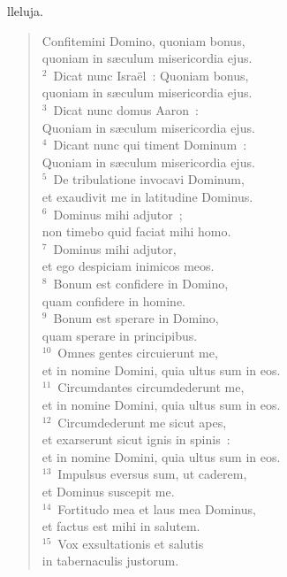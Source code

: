 \bchapter
{}lleluja. \begin{flushleft}\begin{verse}\vspace{6pt}Confitemini Domino, quoniam bonus,\\ quoniam in s\ae culum misericordia ejus.\\
${}^{2}$~Dicat nunc Isra\"el~: Quoniam bonus,\\ quoniam in s\ae culum misericordia ejus.\\
${}^{3}$~Dicat nunc domus Aaron~:\\ Quoniam in s\ae culum misericordia ejus.\\
${}^{4}$~Dicant nunc qui timent Dominum~:\\ Quoniam in s\ae culum misericordia ejus.\\
${}^{5}$~De tribulatione invocavi Dominum,\\ et exaudivit me in latitudine Dominus.\\
${}^{6}$~Dominus mihi adjutor~;\\ non timebo quid faciat mihi homo.\\
${}^{7}$~Dominus mihi adjutor,\\ et ego despiciam inimicos meos.\\
${}^{8}$~Bonum est confidere in Domino,\\ quam confidere in homine.\\
${}^{9}$~Bonum est sperare in Domino,\\ quam sperare in principibus.\\
${}^{10}$~Omnes gentes circuierunt me,\\ et in nomine Domini, quia ultus sum in eos.\\
${}^{11}$~Circumdantes circumdederunt me,\\ et in nomine Domini, quia ultus sum in eos.\\
${}^{12}$~Circumdederunt me sicut apes,\\ et exarserunt sicut ignis in spinis~:\\ et in nomine Domini, quia ultus sum in eos.\\
${}^{13}$~Impulsus eversus sum, ut caderem,\\ et Dominus suscepit me.\\
${}^{14}$~Fortitudo mea et laus mea Dominus,\\ et factus est mihi in salutem.\\
${}^{15}$~Vox exsultationis et salutis\\ in tabernaculis justorum.\\

\end{verse}
\end{flushleft}
